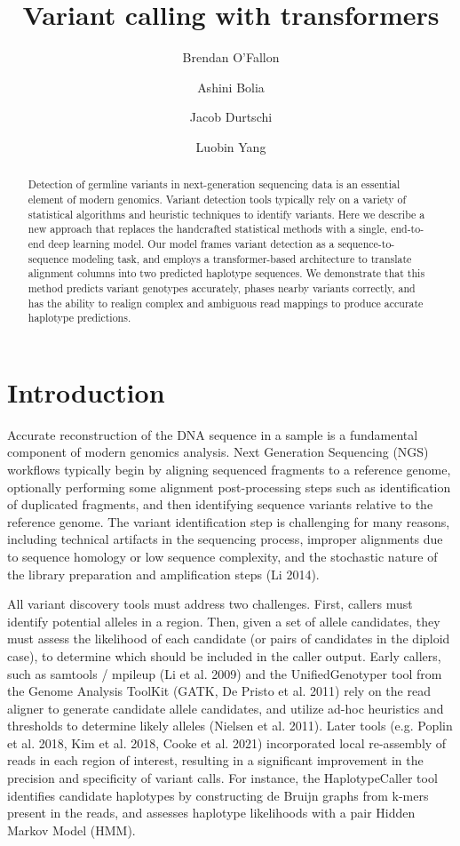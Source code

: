 \documentclass[]{article}
\title{Variant calling with transformers}
\author[1]{Brendan O'Fallon}
\author[1]{Ashini Bolia}
\author[1]{Jacob Durtschi}
\author[1]{Luobin Yang}
\affil[1]{ARUP Institute for Clinical and Experimental Pathology, Salt Lake City, UT}
\date{}
\begin{document}
\maketitle

\begin{abstract}
	Detection of germline variants in next-generation sequencing data is an essential element of modern genomics. Variant detection tools typically rely on a variety of statistical algorithms and heuristic techniques to identify variants. Here we describe a new approach that replaces the handcrafted statistical methods with a single, end-to-end deep learning model. Our model frames variant detection as a sequence-to-sequence modeling task, and employs a transformer-based architecture to translate alignment columns into two predicted haplotype sequences. We demonstrate that this method predicts variant genotypes accurately, phases nearby variants correctly, and has the ability to realign complex and ambiguous read mappings to produce accurate haplotype predictions. 

\end{abstract}



\section{Introduction}

Accurate reconstruction of the DNA sequence in a sample is a fundamental component of modern genomics analysis. Next Generation Sequencing (NGS) workflows typically begin by aligning sequenced fragments to a reference genome, optionally performing some alignment post-processing steps such as identification of duplicated fragments, and then identifying sequence variants relative to the reference genome. The variant identification step is challenging for many reasons, including technical artifacts in the sequencing process, improper alignments due to sequence homology or low sequence complexity, and the stochastic nature of the library preparation and amplification steps (Li 2014). 

All variant discovery tools must address two challenges. First, callers must identify potential  alleles in a region. Then, given a set of allele candidates, they must assess the likelihood of each candidate (or pairs of candidates in the diploid case), to determine which should be included in the caller output. Early callers, such as samtools / mpileup (Li et al. 2009) and the UnifiedGenotyper tool from the Genome Analysis ToolKit (GATK, De Pristo et al. 2011) rely on the read aligner to generate candidate allele candidates, and utilize ad-hoc heuristics and thresholds to determine likely alleles (Nielsen et al. 2011). Later tools (e.g. Poplin et al. 2018, Kim et al. 2018, Cooke et al. 2021) incorporated local re-assembly of reads in each region of interest, resulting in a significant improvement in the precision and specificity of variant calls. For instance, the HaplotypeCaller tool identifies candidate haplotypes by constructing de Bruijn graphs from k-mers present in the reads, and assesses haplotype likelihoods with a pair Hidden Markov Model (HMM). 
\end{document}
